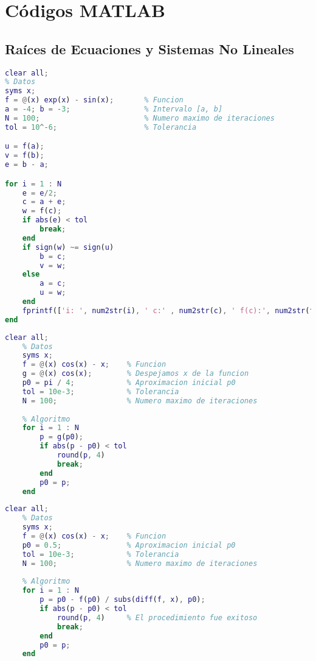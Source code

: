 \onecolumn
\chapter*{Códigos MATLAB}
\section*{Raíces de Ecuaciones y Sistemas No Lineales}

\begin{lstlisting}[caption={Método de la Bisección}, language = Matlab, label = {cod: Método de la Bisección}]
clear all;
% Datos
syms x;
f = @(x) exp(x) - sin(x);       % Funcion
a = -4; b = -3;                 % Intervalo [a, b]
N = 100;                        % Numero maximo de iteraciones
tol = 10^-6;                    % Tolerancia

u = f(a);
v = f(b);
e = b - a;

for i = 1 : N
    e = e/2;
    c = a + e;
    w = f(c);
    if abs(e) < tol
        break;
    end
    if sign(w) ~= sign(u)
        b = c;
        v = w;
    else
        a = c;
        u = w;
    end
    fprintf(['i: ', num2str(i), ' c:' , num2str(c), ' f(c):', num2str(f(c)), '\n'])
end
\end{lstlisting}

\begin{lstlisting}[caption={Iteración de Punto Fijo}, language = Matlab, label = {cod: Iteración de Punto Fijo}]
    clear all;
    % Datos
    syms x;
    f = @(x) cos(x) - x;    % Funcion
    g = @(x) cos(x);        % Despejamos x de la funcion
    p0 = pi / 4;            % Aproximacion inicial p0
    tol = 10e-3;            % Tolerancia
    N = 100;                % Numero maximo de iteraciones
    
    % Algoritmo
    for i = 1 : N
        p = g(p0);
        if abs(p - p0) < tol
            round(p, 4)
            break;
        end
        p0 = p;
    end
\end{lstlisting}

\begin{lstlisting}[caption={Método de Newton}, language = Matlab, label = {cod: Método de Newton}]
    clear all;
    % Datos
    syms x;
    f = @(x) cos(x) - x;    % Funcion
    p0 = 0.5;               % Aproximacion inicial p0
    tol = 10e-3;            % Tolerancia
    N = 100;                % Numero maximo de iteraciones
    
    % Algoritmo
    for i = 1 : N
        p = p0 - f(p0) / subs(diff(f, x), p0);
        if abs(p - p0) < tol
            round(p, 4)     % El procedimiento fue exitoso
            break;
        end
        p0 = p;
    end
\end{lstlisting}

